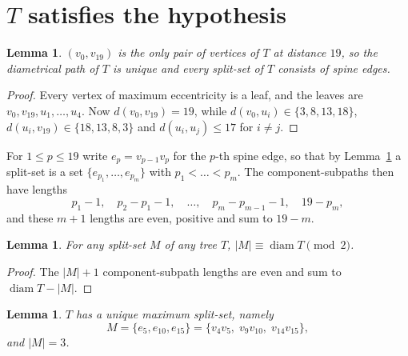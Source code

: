 \documentclass[11pt]{amsart}
\newtheorem{lemma}[theorem]{Lemma}
\theoremstyle{definition}
\DeclareMathOperator{\diam}{diam}
\begin{document}
\section{$T$ satisfies the hypothesis}\label{sec:hyp}

\begin{lemma}\label{lem:uniquepath}
$(v_0,v_{19})$ is the only pair of vertices of $T$ at distance $19$, so the
diametrical path of $T$ is unique and every split-set of $T$ consists of spine
edges.
\end{lemma}

\begin{proof}
Every vertex of maximum eccentricity is a leaf, and the leaves are
$v_0,v_{19},u_1,\dots,u_4$. Now $d(v_0,v_{19})=19$, while
$d(v_0,u_i)\in\{3,8,13,18\}$, $d(u_i,v_{19})\in\{18,13,8,3\}$ and
$d(u_i,u_j)\le 17$ for $i\ne j$.
\end{proof}

For $1\le p\le 19$ write $e_p=v_{p-1}v_p$ for the $p$-th spine edge, so that by
Lemma~\ref{lem:uniquepath} a split-set is a set $\{e_{p_1},\dots,e_{p_m}\}$ with
$p_1<\dots<p_m$. The component-subpaths then have lengths
\begin{equation}\label{eq:parts}
  p_1-1,\quad p_2-p_1-1,\quad\dots,\quad p_m-p_{m-1}-1,\quad 19-p_m ,
\end{equation}
and these $m+1$ lengths are even, positive and sum to $19-m$.

\begin{lemma}\label{lem:parity}
For any split-set $M$ of any tree $T$, $|M|\equiv\diam T\pmod 2$.
\end{lemma}

\begin{proof}
The $|M|+1$ component-subpath lengths are even and sum to $\diam T-|M|$.
\end{proof}

\begin{lemma}\label{lem:splitset}
$T$ has a unique maximum split-set, namely
\[
  M=\{e_5,e_{10},e_{15}\}=\{v_4v_5,\;v_9v_{10},\;v_{14}v_{15}\},
\]
and $|M|=3$.
\end{lemma}
\end{document}
